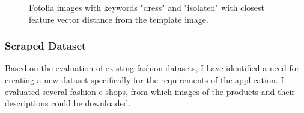\documentclass{article}
\begin{document}
\begin{figure}[h]
\centering
{}\hspace{1cm}
\caption{\label{fig:fotolia} Fotolia images with keywords "dress" and "isolated" with closest feature vector distance from the template image.}
\end{figure}

\pagebreak
\subsubsection{Scraped Dataset}
Based on the evaluation of existing fashion datasets, I have identified a need for creating a new dataset specifically for the requirements of the application. I evaluated several fashion e-shops, from which images of the products and their descriptions could be downloaded. 
\end{document}

